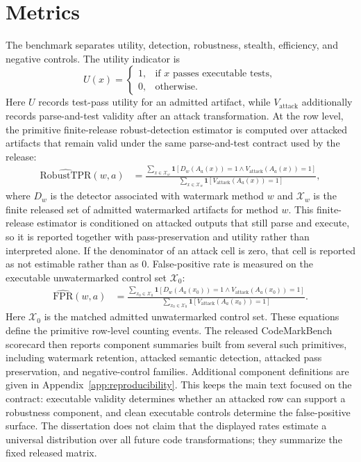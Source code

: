 \section{Metrics}

The benchmark separates utility, detection, robustness, stealth, efficiency, and negative controls. The utility indicator is
\begin{equation}
  U(x) =
  \begin{cases}
  1, & \text{if } x \text{ passes executable tests},\\
  0, & \text{otherwise}.
  \end{cases}
\end{equation}
Here $U$ records test-pass utility for an admitted artifact, while $V_{\mathrm{attack}}$ additionally records parse-and-test validity after an attack transformation. At the row level, the primitive finite-release robust-detection estimator is computed over attacked artifacts that remain valid under the same parse-and-test contract used by the release:
\begin{align}
  \widehat{\mathrm{RobustTPR}}(w,a)
  &= \frac{
  \sum_{x\in\mathcal{X}_w}\mathbf{1}[D_w(A_a(x))=1\wedge V_{\mathrm{attack}}(A_a(x))=1]}
  {\sum_{x\in\mathcal{X}_w}\mathbf{1}[V_{\mathrm{attack}}(A_a(x))=1]},
  \label{eq:robust-tpr}
\end{align}
where $D_w$ is the detector associated with watermark method $w$ and $\mathcal{X}_w$ is the finite released set of admitted watermarked artifacts for method $w$. This finite-release estimator is conditioned on attacked outputs that still parse and execute, so it is reported together with pass-preservation and utility rather than interpreted alone. If the denominator of an attack cell is zero, that cell is reported as not estimable rather than as 0. False-positive rate is measured on the executable unwatermarked control set $\mathcal{X}_0$:
\begin{align}
  \widehat{\mathrm{FPR}}(w,a)
  &= \frac{
  \sum_{x_0\in\mathcal{X}_0}\mathbf{1}[D_w(A_a(x_0))=1\wedge V_{\mathrm{attack}}(A_a(x_0))=1]}
  {\sum_{x_0\in\mathcal{X}_0}\mathbf{1}[V_{\mathrm{attack}}(A_a(x_0))=1]}.
\end{align}
Here $\mathcal{X}_0$ is the matched admitted unwatermarked control set. These equations define the primitive row-level counting events. The released CodeMarkBench scorecard then reports component summaries built from several such primitives, including watermark retention, attacked semantic detection, attacked pass preservation, and negative-control families. Additional component definitions are given in Appendix~\ref{app:reproducibility}. This keeps the main text focused on the contract: executable validity determines whether an attacked row can support a robustness component, and clean executable controls determine the false-positive surface. The dissertation does not claim that the displayed rates estimate a universal distribution over all future code transformations; they summarize the fixed released matrix.
